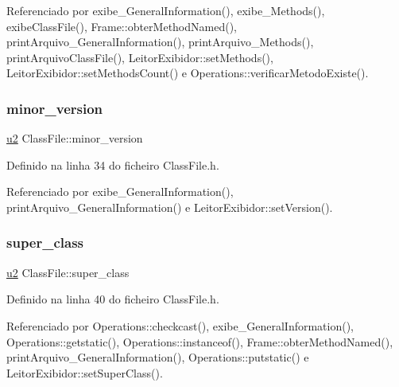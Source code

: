 Referenciado por exibe\+\_\+\+General\+Information(), exibe\+\_\+\+Methods(), exibe\+Class\+File(), Frame\+::obter\+Method\+Named(), print\+Arquivo\+\_\+\+General\+Information(), print\+Arquivo\+\_\+\+Methods(), print\+Arquivo\+Class\+File(), Leitor\+Exibidor\+::set\+Methods(), Leitor\+Exibidor\+::set\+Methods\+Count() e Operations\+::verificar\+Metodo\+Existe().

\mbox{\label{classClassFile_af0db7b0ea01cb9cea2cee177ca81df09}} 
\subsubsection{\texorpdfstring{minor\+\_\+version}{minor\_version}}
{\footnotesize\ttfamily \hyperlink{BasicTypes_8h_a732cde1300aafb73b0ea6c2558a7a54f}{u2} Class\+File\+::minor\+\_\+version}



Definido na linha 34 do ficheiro Class\+File.\+h.



Referenciado por exibe\+\_\+\+General\+Information(), print\+Arquivo\+\_\+\+General\+Information() e Leitor\+Exibidor\+::set\+Version().

\mbox{\label{classClassFile_a5f6c11c0ccb02fd992b5c102725253ec}} 
\subsubsection{\texorpdfstring{super\+\_\+class}{super\_class}}
{\footnotesize\ttfamily \hyperlink{BasicTypes_8h_a732cde1300aafb73b0ea6c2558a7a54f}{u2} Class\+File\+::super\+\_\+class}



Definido na linha 40 do ficheiro Class\+File.\+h.



Referenciado por Operations\+::checkcast(), exibe\+\_\+\+General\+Information(), Operations\+::getstatic(), Operations\+::instanceof(), Frame\+::obter\+Method\+Named(), print\+Arquivo\+\_\+\+General\+Information(), Operations\+::putstatic() e Leitor\+Exibidor\+::set\+Super\+Class().

\mbox{\label{classClassFile_a2d33db0a560a71b94bc572dd1e4ec03a}} 
